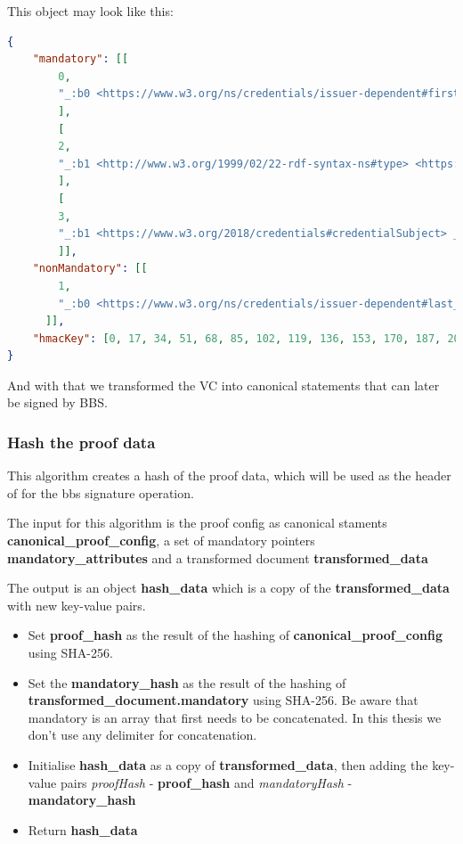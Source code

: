 \documentclass[
	a4paper               %
	,bibliography=totoc   %
	,listof=totoc         %
	,monolingual
	twoside=false,
]{bfhthesis}              %
\begin{document}
This object may look like this:

\begin{lstlisting}[language=json,firstnumber=1,caption={Return object of the VC transformation},captionpos=b]
{
	"mandatory": [[
		0,
		"_:b0 <https://www.w3.org/ns/credentials/issuer-dependent#first_name> \"Joel\" .\n",
		],
		[
		2,
		"_:b1 <http://www.w3.org/1999/02/22-rdf-syntax-ns#type> <https://www.w3.org/2018/credentials#VerifiableCredential> .\n",
		],
		[
		3,
		"_:b1 <https://www.w3.org/2018/credentials#credentialSubject> _:b0 .\n",
		]],
	"nonMandatory": [[
		1,
		"_:b0 <https://www.w3.org/ns/credentials/issuer-dependent#last_name> \"Robles\" .\n",
	  ]],
	"hmacKey": [0, 17, 34, 51, 68, 85, 102, 119, 136, 153, 170, 187, 204, 221, 238, 255, 0, 17, 34, 51, 68, 85, 102, 119, 136, 153, 170, 187, 204, 221, 238, 255],
}
\end{lstlisting}

And with that we transformed the VC into canonical statements that can later be signed by BBS.

\subsubsection{Hash the proof data}
\label{subsubsec:proofHash}
This algorithm creates a hash of the proof data, which will be used as the header of for the bbs signature operation.

The input for this algorithm is the proof config as canonical staments \textbf{canonical\_proof\_config}, a set of mandatory pointers \textbf{mandatory\_attributes} and a transformed document \textbf{transformed\_data}

The output is an object \textbf{hash\_data} which is a copy of the \textbf{transformed\_data} with new key-value pairs.


\begin{itemize}
	\item Set \textbf{proof\_hash} as the result of the hashing of \textbf{canonical\_proof\_config} using SHA-256.
	\item Set the \textbf{mandatory\_hash} as the result of the hashing of \textbf{transformed\_document.mandatory} using SHA-256. Be aware that mandatory is an array that first needs to be concatenated. In this thesis we don't use any delimiter for concatenation.
	\item Initialise \textbf{hash\_data} as a copy of \textbf{transformed\_data}, then adding the key-value pairs \textit{proofHash} - \textbf{proof\_hash} and \textit{mandatoryHash} - \textbf{mandatory\_hash}
	\item Return \textbf{hash\_data}
\end{itemize}
\end{document}
